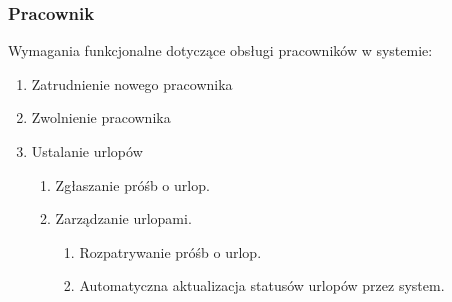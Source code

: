 \subsubsection{Pracownik}

Wymagania funkcjonalne dotyczące obsługi pracowników w systemie:

\begin{enumerate}
  \item Zatrudnienie nowego pracownika
  \item Zwolnienie pracownika
  \item Ustalanie urlopów
  \begin{enumerate}
    \item Zgłaszanie próśb o urlop.
    \item Zarządzanie urlopami.
      \begin{enumerate}
        \item Rozpatrywanie próśb o urlop.
        \item Automatyczna aktualizacja statusów urlopów przez system.
      \end{enumerate}
  \end{enumerate}
\end{enumerate}
